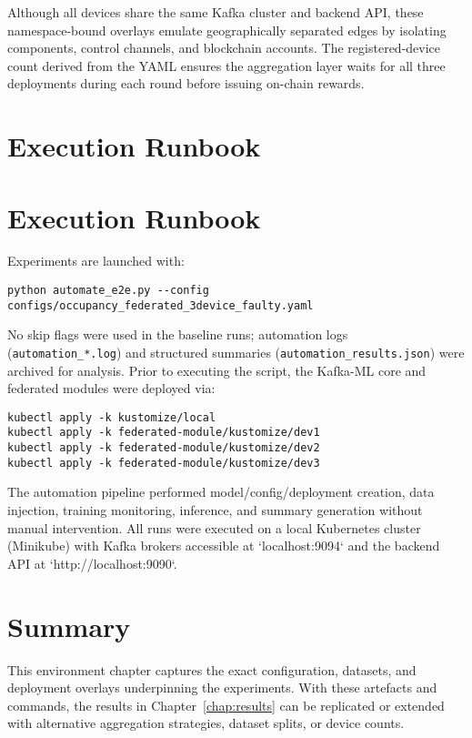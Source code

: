 Although all devices share the same Kafka cluster and backend API, these namespace-bound overlays emulate geographically separated edges by isolating components, control channels, and blockchain accounts. The registered-device count derived from the YAML ensures the aggregation layer waits for all three deployments during each round before issuing on-chain rewards.

\section{Execution Runbook}
\label{sec:execution_runbook}


\section{Execution Runbook}
\label{sec:execution_runbook}

Experiments are launched with:

\begin{verbatim}
python automate_e2e.py --config configs/occupancy_federated_3device_faulty.yaml
\end{verbatim}

No skip flags were used in the baseline runs; automation logs (\texttt{automation\_*.log}) and structured summaries (\texttt{automation\_results.json}) were archived for analysis. Prior to executing the script, the Kafka-ML core and federated modules were deployed via:

\begin{verbatim}
kubectl apply -k kustomize/local
kubectl apply -k federated-module/kustomize/dev1
kubectl apply -k federated-module/kustomize/dev2
kubectl apply -k federated-module/kustomize/dev3
\end{verbatim}

The automation pipeline performed model/config/deployment creation, data injection, training monitoring, inference, and summary generation without manual intervention. All runs were executed on a local Kubernetes cluster (Minikube) with Kafka brokers accessible at `localhost:9094` and the backend API at `http://localhost:9090`.

\section{Summary}

This environment chapter captures the exact configuration, datasets, and deployment overlays underpinning the experiments. With these artefacts and commands, the results in Chapter~\ref{chap:results} can be replicated or extended with alternative aggregation strategies, dataset splits, or device counts.

